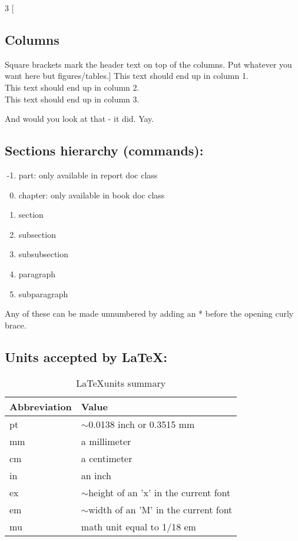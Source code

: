 \documentclass[12pt, letterpaper]{article} %
\begin{document}
\begin{multicols}{3} %
	[\subsection*{Columns}
	Square brackets mark the header text on top of the columns. 
	Put whatever you want here but figures/tables.]
	This text should end up in column 1. \\ 
	This text should end up in column 2. \\ 
	This text should end up in column 3.
\end{multicols}
And would you look at that - it did. Yay.


\clearpage
\subsection*{Sections hierarchy (commands):} %

\begin{enumerate}
	\setcounter{enumi}{-2} %
	\item part: only available in report doc class
	\item chapter: only available in book doc class
	\item section
	\item subsection
	\item subsubsection
	\item paragraph
	\item subparagraph
\end{enumerate}
Any of these can be made unnumbered by adding an * before the opening curly 
brace.

\subsection*{Units accepted by \LaTeX:}

\begin{table}[!h] %
	\centering
	\begin{tabular}{|l|l|}
		\hline
		Abbreviation & Value                                      \\ \hline
		pt           & $\sim$0.0138 inch or 0.3515 mm             \\ \hline
		mm           & a millimeter                               \\ \hline
		cm           & a centimeter                               \\ \hline
		in           & an inch                                    \\ \hline
		ex           & $\sim$height of an 'x' in the current font \\ \hline
		em           & $\sim$width of an 'M' in the current font  \\ \hline
		mu           & math unit equal to 1/18 em                 \\ \hline
	\end{tabular}
	\caption{\LaTeX units summary}
	\label{table:units}
\end{table}
\end{document}
